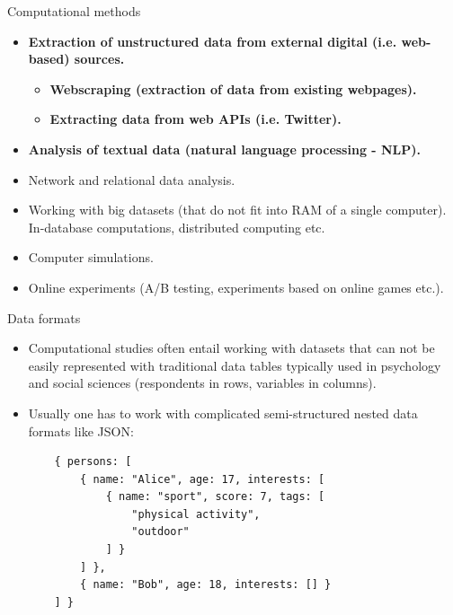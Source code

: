 \documentclass{beamer}
\begin{document}
\begin{frame}[fragile]
\begin{semiverbatim}
\begin{frame}{Computational methods}
\begin{itemize}
    \item \textbf{Extraction of unstructured data from external digital (i.e. web-based)
    sources.}
    \begin{itemize}
        \item \textbf{Webscraping (extraction of data from existing webpages).}
        \item \textbf{Extracting data from web APIs (i.e. Twitter).}
    \end{itemize}
    \item \textbf{Analysis of textual data (natural language processing - NLP).}
    \item Network and relational data analysis.
    \item Working with big datasets (that do not fit into RAM of a single computer).
    In-database computations, distributed computing etc.
    \item Computer simulations.
    \item Online experiments (A/B testing, experiments based on online games etc.).
\end{itemize}
\end{frame}

\begin{frame}[fragile]{Data formats}
\begin{itemize}
    \item Computational studies often entail working with datasets that
    can not be easily represented with traditional data tables typically
    used in psychology and social sciences
    (respondents in rows, variables in columns).
    \item Usually one has to work with complicated semi-structured nested
    data formats like JSON:
    \begin{small}
    \begin{verbatim}
    { persons: [
        { name: "Alice", age: 17, interests: [
            { name: "sport", score: 7, tags: [
                "physical activity",
                "outdoor"
            ] }
        ] },
        { name: "Bob", age: 18, interests: [] }
    ] }
    \end{verbatim}
    \end{small}
\end{itemize}
\end{frame}


\end{semiverbatim}
\end{frame}
\end{document}

